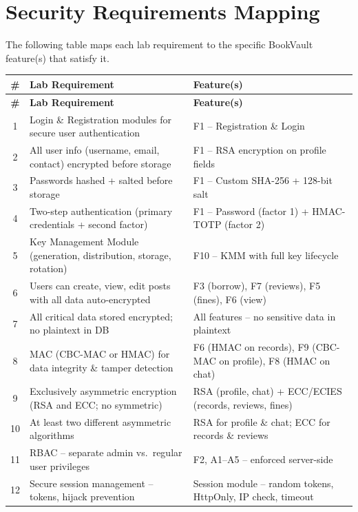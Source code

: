 \documentclass[12pt]{article}
\begin{document}
\section{Security Requirements Mapping}

The following table maps each lab requirement to the specific BookVault feature(s) that satisfy it.

\begin{center}
\renewcommand{\arraystretch}{1.3}
\begin{longtable}{c p{6cm} p{5.5cm}}
    \toprule
    \textbf{\#} & \textbf{Lab Requirement} & \textbf{Feature(s)} \\
    \midrule
    \endfirsthead
    \toprule
    \textbf{\#} & \textbf{Lab Requirement} & \textbf{Feature(s)} \\
    \midrule
    \endhead
    1 & Login \& Registration modules for secure user authentication & F1 -- Registration \& Login \\
    2 & All user info (username, email, contact) encrypted before storage & F1 -- RSA encryption on profile fields \\
    3 & Passwords hashed + salted before storage & F1 -- Custom SHA-256 + 128-bit salt \\
    4 & Two-step authentication (primary credentials + second factor) & F1 -- Password (factor 1) + HMAC-TOTP (factor 2) \\
    5 & Key Management Module (generation, distribution, storage, rotation) & F10 -- KMM with full key lifecycle \\
    6 & Users can create, view, edit posts with all data auto-encrypted & F3 (borrow), F7 (reviews), F5 (fines), F6 (view) \\
    7 & All critical data stored encrypted; no plaintext in DB & All features -- no sensitive data in plaintext \\
    8 & MAC (CBC-MAC or HMAC) for data integrity \& tamper detection & F6 (HMAC on records), F9 (CBC-MAC on profile), F8 (HMAC on chat) \\
    9 & Exclusively asymmetric encryption (RSA and ECC; no symmetric) & RSA (profile, chat) + ECC/ECIES (records, reviews, fines) \\
    10 & At least two different asymmetric algorithms & RSA for profile \& chat; ECC for records \& reviews \\
    11 & RBAC -- separate admin vs.\ regular user privileges & F2, A1--A5 -- enforced server-side \\
    12 & Secure session management -- tokens, hijack prevention & Session module -- random tokens, HttpOnly, IP check, timeout \\
    \bottomrule
\end{longtable}
\end{center}
\end{document}
